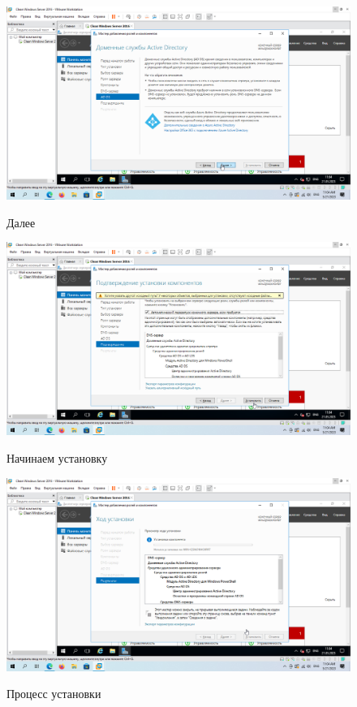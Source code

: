 \documentclass[a4paper]{article}
\begin{document}
  \begin{figure}[H]
    \centering
    \includegraphics[width=\textwidth]{11_0013}
    \label{img:13}
    \caption{Далее}
  \end{figure}

  \begin{figure}[H]
    \centering
    \includegraphics[width=\textwidth]{11_0014}
    \label{img:14}
    \caption{Начинаем установку}
  \end{figure}

  \begin{figure}[H]
    \centering
    \includegraphics[width=\textwidth]{11_0015}
    \label{img:15}
    \caption{Процесс установки}
  \end{figure}
\end{document}
